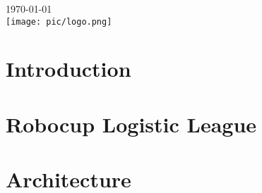 \documentclass[12pt]{report}
\begin{document}
\begin{titlepage}


{\large \today}\\[2cm] %


\texttt{[image: pic/logo.png]}\\[1cm] %


\vfill %

\end{titlepage}

\tableofcontents
\listoffigures
\listoftables


\begin{abstract}
	
\end{abstract}

\chapter{Introduction}
	

\chapter{Robocup Logistic League}
	

\chapter{Architecture}
    
\end{document}
